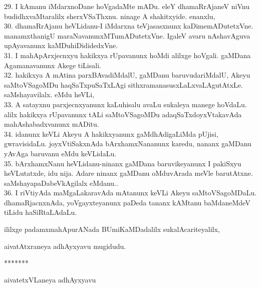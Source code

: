 \documentclass{article}
\begin{document}
29. I kAmanu iMdarxnoDane hoVgadaMte mADu. eleY dhamaRrAjaneV niVnu budidhxvaMtaralilx sherxVSaThxnu. ninage A shakitxyide. enanxlu,\\
30. dhamaRrAjanu heVLidanu-I iMdarxna teVjasasxnunx kaDimemADutetxVne. manamxthanigU maraNavanunxMTumADutetxVne. IgaleV avaru nAshavAguva upAyavanunx kaMDuhiDididedxVne.\\
31. I mahApArxjecnxyu hakikxya rUpavanunx hoMdi alilxge hoVgali. gaMDana Agamanavanunx Akege tiLisali.\\
32. hakikxya A mAtina parxBAvadiMdalU, gaMDanu baruvudariMdalU, Akeyu saMtoVSagoMDu haqSaTxpuSaTxLAgi sithxramanasusxLaLxvaLAgutAtxLe. saMshayavilalx. eMdu heVLi,\\
33. A satayxnu parxjecnxyanunx kaLuhisalu avaLu sukaleya manege hoVdaLu. alilx hakikxya rUpavanunx tALi saMtoVSagoMDu adaqSaTxdoyxVtakavAda mahAshabadxvanunx mADitu.\\
34. idanunx keVLi Akeyu A hakikxyanunx gaMdhAdigaLiMda pUjisi, gwravisidaLu. joyxVtiSakxnAda bArxhamxNananunx karedu, nananx gaMDanu yAvAga baruvanu eMdu keVLidaLu.\\
35. bArxhamxNanu heVLidanu-ninanx gaMDana baruvikeyanunx I pakiSxyu heVLutatxde, idu nija. Adare ninanx gaMDanu oMduvArada meVle barutAtxne. saMshayapaDabeVkAgilalx eMdanu..\\
36. I riVtiyAda maMgaLakaravAda mAtanunx keVLi Akeyu saMtoVSagoMDaLu. dhamaRjacnxnAda, yoVgayxteyanunx paDeda tananx kAMtanu baMdaneMdeV tiLidu haSiRtaLAdaLu.\\

\begin{center}
ililxge padamxmahApurANada BUmiKaMDadalilx sukalAcariteyalilx,
\end{center}

\begin{center}
aivatAtxraneya adhAyxyavu mugidudu.
\end{center}

\begin{center}
*******
\end{center}

\begin{center}
aivatetxVLaneya adhAyxyavu
\end{center}
\end{document}
